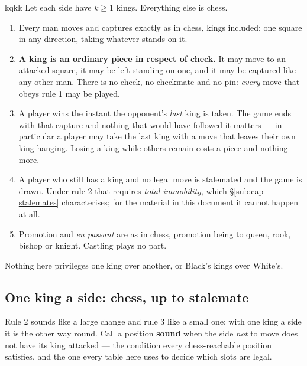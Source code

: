 \documentclass[10pt]{article}
\begin{document}
\begin{result}[title={The rules: every king is a man, and you win by taking them all}]{kqkk}
Let each side have $k\ge1$ kings. Everything else is chess.

\smallskip
\begin{enumerate}\setlength{\itemsep}{2pt}
\item Every man moves and captures exactly as in chess, kings included: one
  square in any direction, taking whatever stands on it.
\item \textbf{A king is an ordinary piece in respect of check.} It may move to
  an attacked square, it may be left standing on one, and it may be captured
  like any other man. There is no check, no checkmate and no pin: \emph{every}
  move that obeys rule 1 may be played.
\item A player wins the instant the opponent's \emph{last} king is taken. The
  game ends with that capture and nothing that would have followed it matters
  --- in particular a player may take the last king with a move that leaves
  their own king hanging. Losing a king while others remain costs a piece and
  nothing more.
\item A player who still has a king and no legal move is stalemated and the
  game is drawn. Under rule 2 that requires \emph{total immobility}, which
  \S\ref{sub:cap-stalemates} characterises; for the material in this document
  it cannot happen at all.
\item Promotion and \emph{en passant} are as in chess, promotion being to
  queen, rook, bishop or knight. Castling plays no part.
\end{enumerate}

\smallskip
Nothing here privileges one king over another, or Black's kings over White's.
\end{result}

\subsection{One king a side: chess, up to stalemate}\label{sub:cap-onceking}

\noindent
Rule 2 sounds like a large change and rule 3 like a small one; with one king a
side it is the other way round. Call a position \textbf{sound} when the side
\emph{not} to move does not have its king attacked --- the condition every
chess-reachable position satisfies, and the one every table here uses to decide
which slots are legal.
\end{document}
